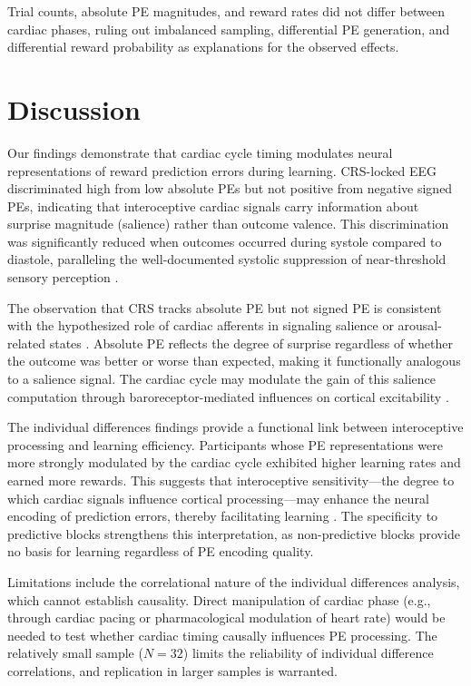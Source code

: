 \documentclass[11pt]{article}
\begin{document}
Trial counts, absolute PE magnitudes, and reward rates did not differ between cardiac phases, ruling out imbalanced sampling, differential PE generation, and differential reward probability as explanations for the observed effects.

\section{Discussion}

Our findings demonstrate that cardiac cycle timing modulates neural representations of reward prediction errors during learning. CRS-locked EEG discriminated high from low absolute PEs but not positive from negative signed PEs, indicating that interoceptive cardiac signals carry information about surprise magnitude (salience) rather than outcome valence. This discrimination was significantly reduced when outcomes occurred during systole compared to diastole, paralleling the well-documented systolic suppression of near-threshold sensory perception \citep{park2014cardiac, baroreceptor_systole2009}.

The observation that CRS tracks absolute PE but not signed PE is consistent with the hypothesized role of cardiac afferents in signaling salience or arousal-related states \citep{critchley2004neural, garfinkel2015knowing}. Absolute PE reflects the degree of surprise regardless of whether the outcome was better or worse than expected, making it functionally analogous to a salience signal. The cardiac cycle may modulate the gain of this salience computation through baroreceptor-mediated influences on cortical excitability \citep{lacey1978cardiac}.

The individual differences findings provide a functional link between interoceptive processing and learning efficiency. Participants whose PE representations were more strongly modulated by the cardiac cycle exhibited higher learning rates and earned more rewards. This suggests that interoceptive sensitivity---the degree to which cardiac signals influence cortical processing---may enhance the neural encoding of prediction errors, thereby facilitating learning \citep{interoception_learning2021, heartbeat_perception2019}. The specificity to predictive blocks strengthens this interpretation, as non-predictive blocks provide no basis for learning regardless of PE encoding quality.

Limitations include the correlational nature of the individual differences analysis, which cannot establish causality. Direct manipulation of cardiac phase (e.g., through cardiac pacing or pharmacological modulation of heart rate) would be needed to test whether cardiac timing causally influences PE processing. The relatively small sample ($N = 32$) limits the reliability of individual difference correlations, and replication in larger samples is warranted.
\end{document}
